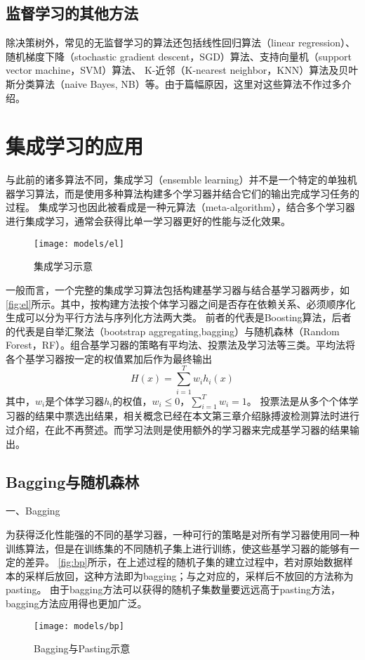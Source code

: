 \subsection{监督学习的其他方法}
除决策树外，常见的无监督学习的算法还包括线性回归算法（linear regression）、随机梯度下降（stochastic gradient descent，SGD）算法、支持向量机（support vector machine，SVM）算法、
K-近邻（K-nearest neighbor，KNN）算法及贝叶斯分类算法（naive Bayes, NB）等\cite{Zhou2016,Li2017,Liu2018,Aurélien2018}。由于篇幅原因，这里对这些算法不作过多介绍。

\section{集成学习的应用}
与此前的诸多算法不同，集成学习（ensemble learning）并不是一个特定的单独机器学习算法，而是使用多种算法构建多个学习器并结合它们的输出完成学习任务的过程\cite{Zhou2016,Aurélien2018}。
集成学习也因此被看成是一种元算法（meta-algorithm），结合多个学习器进行集成学习，通常会获得比单一学习器更好的性能与泛化效果。
\begin{figure}[htbp]
    \centering
    \texttt{[image: models/el]}
    \caption[集成学习示意]{\label{fig:el}集成学习示意}
\end{figure}

一般而言，一个完整的集成学习算法包括构建基学习器与结合基学习器两步，如\autoref{fig:el}所示。其中，按构建方法按个体学习器之间是否存在依赖关系、必须顺序化生成可以分为平行方法与序列化方法两大类\cite{Zhou2016}。
前者的代表是Boosting算法，后者的代表是自举汇聚法（bootstrap aggregating,bagging）与随机森林（Random Forest，RF）。组合基学习器的策略有平均法、投票法及学习法等三类。平均法将各个基学习器按一定的权值累加后作为最终输出
\begin{equation}
    \label{equ:average}
    H(x)=\sum_{i=1}^{T}{w_ih_i(x)}
\end{equation}
其中，$w_i$是个体学习器$h_i$的权值，$w_i\le 0$，$\sum_{i=1}^T{w_i}=1$。
投票法是从多个个体学习器的结果中票选出结果，相关概念已经在本文第三章介绍脉搏波检测算法时进行过介绍，在此不再赘述。而学习法则是使用额外的学习器来完成基学习器的结果输出。

\subsection{Bagging与随机森林}
一、Bagging

为获得泛化性能强的不同的基学习器，一种可行的策略是对所有学习器使用同一种训练算法，但是在训练集的不同随机子集上进行训练，使这些基学习器的能够有一定的差异。
\autoref{fig:bp}所示，在上述过程的随机子集的建立过程中，若对原始数据样本的采样后放回，这种方法即为bagging；与之对应的，采样后不放回的方法称为pasting\cite{Aurélien2018,Zhou2016}。
由于bagging方法可以获得的随机子集数量要远远高于pasting方法，bagging方法应用得也更加广泛。
\begin{figure}[htbp]
    \centering
    \texttt{[image: models/bp]}
    \caption[Bagging与Pasting示意]{\label{fig:bp}Bagging与Pasting示意\cite{Aurélien2018}}
\end{figure}

